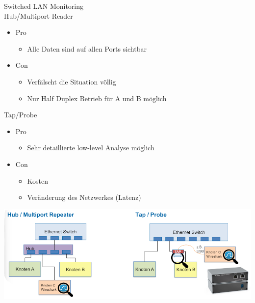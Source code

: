 \begin{concept}{Switched LAN Monitoring}\\
    Hub/Multiport Reader
    \begin{itemize}
        \item Pro
        \begin{itemize}
            \item Alle Daten sind auf allen Ports sichtbar
        \end{itemize}
        \item Con
        \begin{itemize}
            \item Verfälscht die Situation völlig
            \item Nur Half Duplex Betrieb für A und B möglich
        \end{itemize}
    \end{itemize}
    Tap/Probe
    \begin{itemize}
        \item Pro
        \begin{itemize}
            \item Sehr detaillierte low-level Analyse möglich
        \end{itemize}
        \item Con
        \begin{itemize}
            \item Kosten
            \item Veränderung des Netzwerkes (Latenz)
        \end{itemize}
    \end{itemize}
\end{concept}

\includegraphics[width=1\linewidth]{images/switched_lan_monitoring.png}

